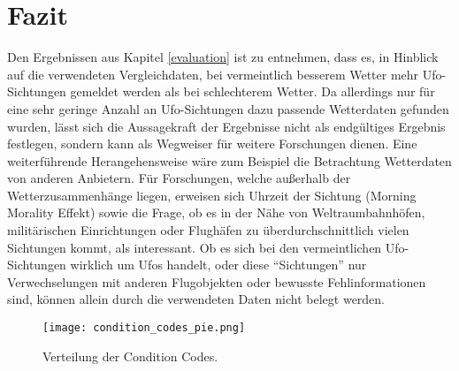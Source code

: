 \section{Fazit} \label{fazit}

Den Ergebnissen aus Kapitel \ref{evaluation} ist zu entnehmen, dass es, in Hinblick auf die verwendeten Vergleichdaten, bei vermeintlich besserem Wetter mehr Ufo-Sichtungen gemeldet werden als bei schlechterem Wetter. Da allerdings nur für eine sehr geringe Anzahl an Ufo-Sichtungen dazu passende Wetterdaten gefunden wurden, lässt sich die Aussagekraft der Ergebnisse nicht als endgültiges Ergebnis festlegen, sondern kann als Wegweiser für weitere Forschungen dienen. Eine weiterführende Herangehensweise wäre zum Beispiel die Betrachtung Wetterdaten von anderen Anbietern. Für Forschungen, welche außerhalb der Wetterzusammenhänge liegen, erweisen sich Uhrzeit der Sichtung (Morning Morality Effekt) sowie die Frage, ob es in der Nähe von Weltraumbahnhöfen, militärischen Einrichtungen oder Flughäfen zu überdurchschnittlich vielen Sichtungen kommt, als interessant. Ob es sich bei den vermeintlichen Ufo-Sichtungen wirklich um Ufos handelt, oder diese \enquote{Sichtungen} nur Verwechselungen mit anderen Flugobjekten oder bewusste Fehlinformationen sind, können allein durch die verwendeten Daten nicht belegt werden.

\begin{figure}[t]
    \centering
    \texttt{[image: condition\_codes\_pie.png]}
    \caption{Verteilung der Condition Codes.}
    \label{fig:coco_pie}
\end{figure}